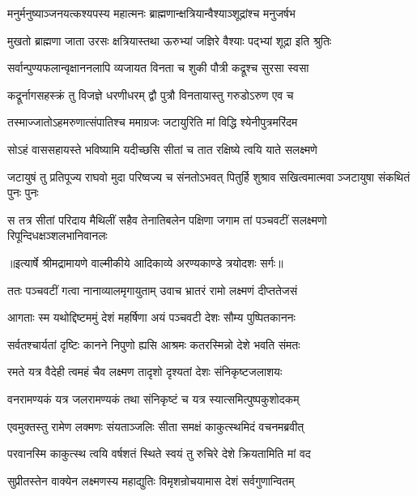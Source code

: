 \twolineshloka
{मनुर्मनुष्याञ्जनयत्कश्यपस्य महात्मनः}
{ब्राह्मणान्क्षत्रियान्वैश्याञ्शूद्रांश्च मनुजर्षभ} %

\twolineshloka
{मुखतो ब्राह्मणा जाता उरसः क्षत्रियास्तथा}
{ऊरुभ्यां जज्ञिरे वैश्याः पद्भ्यां शूद्रा इति श्रुतिः} %

\twolineshloka
{सर्वान्पुण्यफलान्वृक्षाननलापि व्यजायत}
{विनता च शुकी पौत्री कद्रूश्च सुरसा स्वसा} %

\twolineshloka
{कद्रूर्नागसहस्क्रं तु विजज्ञे धरणीधरम्}
{द्वौ पुत्रौ विनतायास्तु गरुडोऽरुण एव च} %

\twolineshloka
{तस्माज्जातोऽहमरुणात्संपातिश्च ममाग्रजः}
{जटायुरिति मां विद्धि श्येनीपुत्रमरिंदम} %

\twolineshloka
{सोऽहं वाससहायस्ते भविष्यामि यदीच्छसि}
{सीतां च तात रक्षिष्ये त्वयि याते सलक्ष्मणे} %

\fourlineindentedshloka
{जटायुषं तु प्रतिपूज्य राघवो}
{ मुदा परिष्वज्य च संनतोऽभवत्}
{पितुर्हि शुश्राव सखित्वमात्मवा}
{ञ्जटायुषा संकथितं पुनः पुनः} %

\fourlineindentedshloka
{स तत्र सीतां परिदाय मैथिलीं}
{ सहैव तेनातिबलेन पक्षिणा}
{जगाम तां पञ्चवटीं सलक्ष्मणो}
{ रिपून्दिधक्षञ्शलभानिवानलः} %


{॥इत्यार्षे श्रीमद्रामायणे वाल्मीकीये आदिकाव्ये अरण्यकाण्डे त्रयोदशः सर्गः॥}


\twolineshloka
{ततः पञ्चवटीं गत्वा नानाव्यालमृगायुताम्}
{उवाच भ्रातरं रामो लक्ष्मणं दीप्ततेजसं} %

\twolineshloka
{आगताः स्म यथोद्दिष्टममुं देशं महर्षिणा}
{अयं पञ्चवटी देशः सौम्य पुष्पितकाननः} %

\twolineshloka
{सर्वतश्चार्यतां दृष्टिः कानने निपुणो ह्यसि}
{आश्रमः कतरस्मिन्नो देशे भवति संमतः} %

\twolineshloka
{रमते यत्र वैदेही त्वमहं चैव लक्ष्मण}
{तादृशो दृश्यतां देशः संनिकृष्टजलाशयः} %

\twolineshloka
{वनरामण्यकं यत्र जलरामण्यकं तथा}
{संनिकृष्टं च यत्र स्यात्समित्पुष्पकुशोदकम्} %

\twolineshloka
{एवमुक्तस्तु रामेण लक्मणः संयताञ्जलिः}
{सीता समक्षं काकुत्स्थमिदं वचनमब्रवीत्} %

\twolineshloka
{परवानस्मि काकुत्स्थ त्वयि वर्षशतं स्थिते}
{स्वयं तु रुचिरे देशे क्रियतामिति मां वद} %

\twolineshloka
{सुप्रीतस्तेन वाक्येन लक्ष्मणस्य महाद्युतिः}
{विमृशन्रोचयामास देशं सर्वगुणान्वितम्} %

